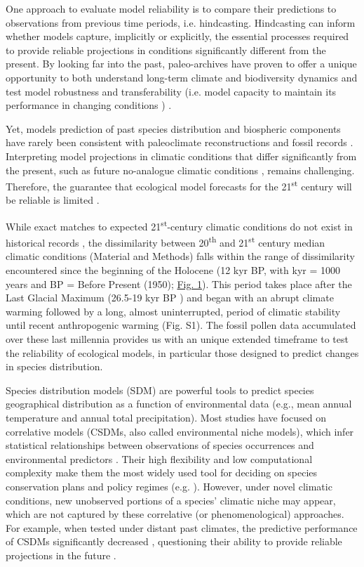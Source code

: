 \documentclass[9pt,twocolumn,twoside]{pnas-new}
\begin{document}
One approach to evaluate model reliability is to compare their predictions to observations from previous time periods, i.e. hindcasting. Hindcasting can inform whether models capture, implicitly or explicitly, the essential processes required to provide reliable projections in conditions significantly different from the present. By looking far into the past, paleo-archives have proven to offer a unique opportunity to both understand long-term climate and biodiversity dynamics \cite{Bartlein2011, Fordham2020} and test model robustness and transferability (i.e. model capacity to maintain its performance in changing conditions \cite{UribeRivera2023}) \cite{Braconnot2012, Maguire2015}.  

Yet, models prediction of past species distribution and biospheric components have rarely been consistent with paleoclimate reconstructions and fossil records \cite{Veloz2012, Pearman2008, Roberts2012, Foley2013, Maguire2016} . Interpreting model projections in climatic conditions that differ significantly from the present, such as future no-analogue climatic conditions \cite{Williams2007}, remains challenging. Therefore, the guarantee that ecological model forecasts for the 21\textsuperscript{st} century will be reliable is limited \cite{Fitzpatrick2018}. 

While exact matches to expected 21\textsuperscript{st}-century climatic conditions do not exist in historical records \cite{Burke2018}, the dissimilarity between 20\textsuperscript{th} and 21\textsuperscript{st} century median climatic conditions (Material and Methods) falls within the range of dissimilarity encountered since the beginning of the Holocene (12 kyr BP, with kyr = 1000 years and BP = Before Present (1950); \hyperref[fig:climaticdissimilarity]{Fig. 1}). This period takes place after the Last Glacial Maximum (26.5-19 kyr BP \cite{Clark2009}) and began with an abrupt climate warming followed by a long, almost uninterrupted, period of climatic stability until recent anthropogenic warming (Fig. S1). The fossil pollen data accumulated over these last millennia provides us with an unique extended timeframe to test the reliability of ecological models, in particular those designed to predict changes in species distribution.

Species distribution models (SDM) are powerful tools to predict species geographical distribution as a function of environmental data (e.g., mean annual temperature and annual total precipitation). Most studies have focused on correlative models (CSDMs, also called environmental niche models), which infer statistical relationships between observations of species occurrences and environmental predictors \cite{Dormann2012}. Their high flexibility and low computational complexity make them the most widely used tool for deciding on species conservation plans and policy regimes (e.g. \cite{Hanewinkel2013}). However, under novel climatic conditions, new unobserved portions of a species’ climatic niche may appear, which are not captured by these correlative (or phenomenological) approaches. For example, when tested under distant past climates, the predictive performance of CSDMs  significantly decreased \cite{Maguire2016}, questioning their ability to provide reliable projections in the future \cite{Fitzpatrick2018}. 
\end{document}
